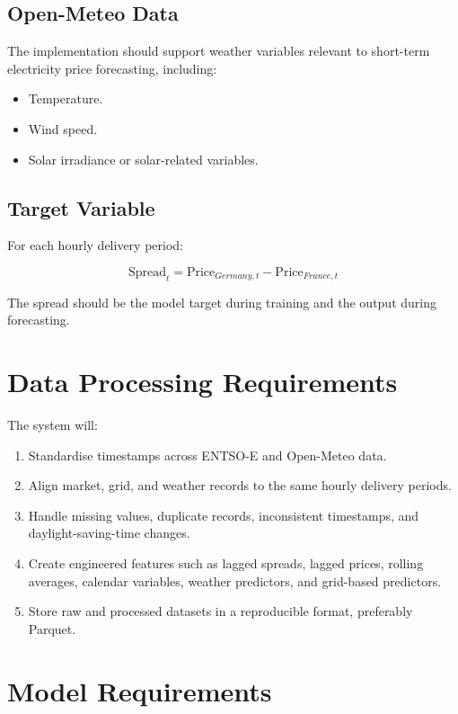 \documentclass[12pt,a4paper]{article}
\begin{document}
\subsection{Open-Meteo Data}

The implementation should support weather variables relevant to short-term electricity price forecasting, including:

\begin{itemize}
    \item Temperature.
    \item Wind speed.
    \item Solar irradiance or solar-related variables.
\end{itemize}

\subsection{Target Variable}

For each hourly delivery period:

\[
\text{Spread}_{t} = \text{Price}_{Germany,t} - \text{Price}_{France,t}
\]

The spread should be the model target during training and the output during forecasting.

\section{Data Processing Requirements}

The system will:

\begin{enumerate}
    \item Standardise timestamps across ENTSO-E and Open-Meteo data.
    \item Align market, grid, and weather records to the same hourly delivery periods.
    \item Handle missing values, duplicate records, inconsistent timestamps, and daylight-saving-time changes.
    \item Create engineered features such as lagged spreads, lagged prices, rolling averages, calendar variables, weather predictors, and grid-based predictors.
    \item Store raw and processed datasets in a reproducible format, preferably Parquet.
\end{enumerate}

\section{Model Requirements}
\end{document}
